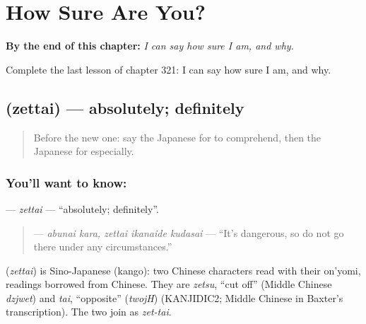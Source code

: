 
\chapter{How Sure Are You?}
\label{ch:ja-how-sure-are-you}

\begin{chapteropening}
\textbf{By the end of this chapter:} \emph{I can say how sure I am, and why.}

Complete the last lesson of chapter 321: I can say how sure I am, and why.
\end{chapteropening}

\section[\texorpdfstring{\ja{ぜったい} (zettai)}{ぜったい (zettai)}]{ (zettai) — absolutely; definitely}

\label{lesson:JA-C321-zettai}



\begin{quote}
Before the new one: say the Japanese for to comprehend, then the Japanese for especially.
\end{quote}

\subsection*{You'll want to know: }
\textbf{} — \emph{zettai} — \textquotedblleft{}absolutely; definitely\textquotedblright{}.

\begin{quote}
\textbf{  } — \emph{abunai kara, zettai ikanaide kudasai} — \textquotedblleft{}It's dangerous, so do not go there under any circumstances.\textquotedblright{}
\end{quote}

\begin{cousinweb}
\textbf{} (\emph{zettai}) is Sino-Japanese (kango): two Chinese characters read with their on'yomi, readings borrowed from Chinese. They are \emph{zetsu}, \textquotedblleft{}cut off\textquotedblright{} (Middle Chinese \emph{dzjwet}) and \emph{tai}, \textquotedblleft{}opposite\textquotedblright{} (\emph{twojH}) (KANJIDIC2; Middle Chinese in Baxter's transcription). The two join as \emph{zet-tai}.
\end{cousinweb}

